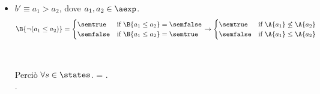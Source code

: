 {\begin{enumerate}[label=(\alph*)]
\begin{itemize}
    \item $ b' \equiv a_1 > a_2$, dove $a_1, a_2 \in \aexp$. \\
      \begin{align*} 
       \B{\lnot(a_1 \leq a_2)} = 
        \begin{cases}
        \semtrue &
        \mbox{if} \ \B{a_1 \leq a_2} = \semfalse \\
        \semfalse & 
        \mbox{if} \ \B{a_1 \leq a_2} = \semtrue \\
        \end{cases} 
        \rightarrow
        \begin{cases} 
        \semtrue & 
        \mbox{if} \ \A{a_1} \not \leq \A{a_2}\\ 
        \semfalse & 
        \mbox{if} \ \A{a_1} \leq \A{a_2}\\
        \end{cases} 
      \end{align*} \\ \\
      Perciò $\forall s \in \states$. = . \\.


\end{itemize}
\end{enumerate}}
